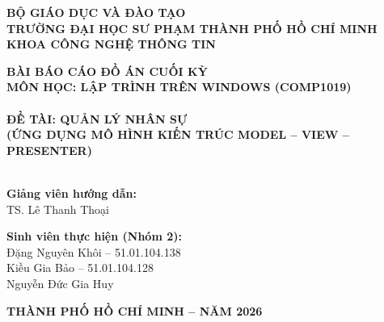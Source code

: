 \documentclass[12pt,a4paper]{report}
\begin{document}
\begin{titlepage}
    \begin{center}
        \textbf{\large BỘ GIÁO DỤC VÀ ĐÀO TẠO}\\[0.2cm]
        \textbf{\large TRƯỜNG ĐẠI HỌC SƯ PHẠM THÀNH PHỐ HỒ CHÍ MINH}\\[0.2cm]
        \textbf{\large KHOA CÔNG NGHỆ THÔNG TIN}\\[1.0cm]
        
        \vspace{2.5cm}
        
        \textbf{\Large BÀI BÁO CÁO ĐỒ ÁN CUỐI KỲ}\\[0.4cm]
        \textbf{\large MÔN HỌC: LẬP TRÌNH TRÊN WINDOWS (COMP1019)}\\[1.2cm]
        
        \makebox[\textwidth]{\rule{0.8\textwidth}{1.5pt}}\\[0.6cm]
        {\huge\bfseries ĐỀ TÀI: QUẢN LÝ NHÂN SỰ}\\[0.3cm]
        {\large\bfseries (ỨNG DỤNG MÔ HÌNH KIẾN TRÚC MODEL -- VIEW -- PRESENTER)}\\[0.6cm]
        \makebox[\textwidth]{\rule{0.8\textwidth}{1.5pt}}\\[2.0cm]
        
        \begin{minipage}[t]{0.45\textwidth}
            \textbf{Giảng viên hướng dẫn:}\\
            TS. Lê Thanh Thoại
        \end{minipage}
        \hfill
        \begin{minipage}[t]{0.45\textwidth}
            \textbf{Sinh viên thực hiện (Nhóm 2):}\\
            Đặng Nguyên Khôi -- 51.01.104.138\\
            Kiều Gia Bảo -- 51.01.104.128\\
            Nguyễn Đức Gia Huy
        \end{minipage}
        
        \vfill
        \textbf{\large THÀNH PHỐ HỒ CHÍ MINH -- NĂM 2026}
    \end{center}
\end{titlepage}

\setcounter{page}{1}
\end{document}
